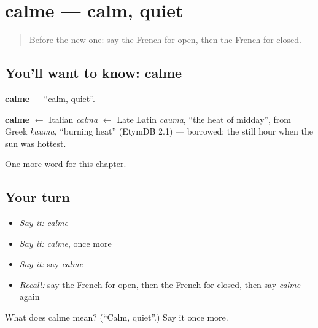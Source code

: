 \section[calme]{calme — calm, quiet}

\label{lesson:FR-C131-calme}



\begin{quote}
Before the new one: say the French for open, then the French for closed.
\end{quote}

\subsection*{You'll want to know: calme}
\textbf{calme} — \textquotedblleft{}calm, quiet\textquotedblright{}.

\begin{cousinweb}
\textbf{calme} $\leftarrow$ Italian \emph{calma} $\leftarrow$ Late Latin \emph{cauma}, \textquotedblleft{}the heat of midday\textquotedblright{}, from Greek \emph{kauma}, \textquotedblleft{}burning heat\textquotedblright{} (EtymDB 2.1) — borrowed: the still hour when the sun was hottest.
\end{cousinweb}

\begin{grammarlens}[title={What you've built}]
One more word for this chapter.
\end{grammarlens}

\subsection*{Your turn}
\begin{itemize}
\raggedright
  \item \emph{Say it:} \emph{calme}
  \item \emph{Say it:} \emph{calme}, once more
  \item \emph{Say it:} say \emph{calme}
  \item \emph{Recall:} say the French for open, then the French for closed, then say \emph{calme} again
\end{itemize}

\begin{tcolorbox}[breakable,colback=teal!4,colframe=teal!35!black,title={Before you move on}]
What does calme mean? (\textquotedblleft{}Calm, quiet\textquotedblright{}.) Say it once more.
\end{tcolorbox}
